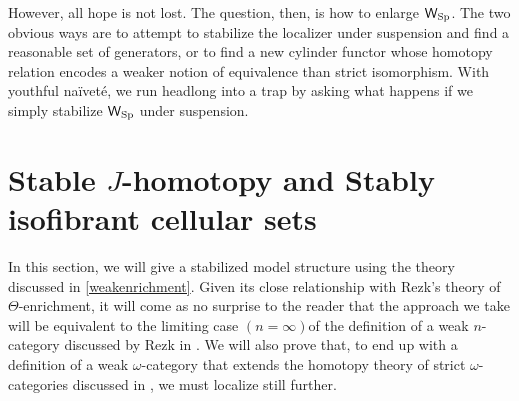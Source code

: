 However, all hope is not lost.  The question, then, is how to enlarge \(\mathsf{W}_{{\operatorname{Sp}}}\). The two obvious ways are to attempt to stabilize the localizer under suspension and find a reasonable set of generators, or to find a new cylinder functor whose homotopy relation encodes a weaker notion of equivalence than strict isomorphism. With youthful na\"ivet\'e, we run headlong into a trap by asking what happens if we simply stabilize \(\mathsf{W}_{{\operatorname{Sp}}}\) under suspension.

\section{Stable $J$-homotopy and Stably isofibrant cellular sets}
In this section, we will give a stabilized model structure using the theory discussed in \eqref{weakenrichment}.  Given its close relationship with Rezk's theory of \(\Theta\)-enrichment, it will come as no surprise to the reader that the approach we take will be equivalent to the limiting case \((n=\infty)\)of the definition of a weak \(n\)-category discussed by Rezk in \cite{rezk-theta-n-spaces}.  We will also prove that, to end up with a definition of a weak \(\omega\)-category that extends the homotopy theory of strict \(\omega\)-categories discussed in \cite{lmw}, we must localize still further.

